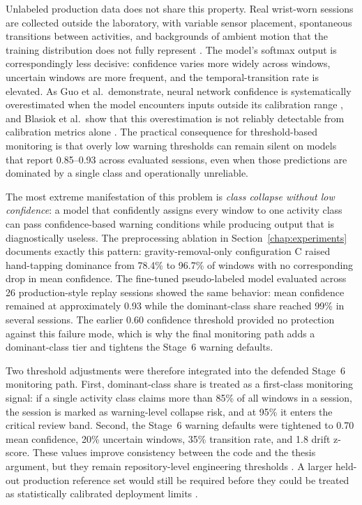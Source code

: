 Unlabeled production data does not share this property. Real wrist-worn sessions are collected outside the laboratory, with variable sensor placement, spontaneous transitions between activities, and backgrounds of ambient motion that the training distribution does not fully represent \cite{dhekane2024transfer,akbari2020personalizing,wang2024enhancing}. The model's softmax output is correspondingly less decisive: confidence varies more widely across windows, uncertain windows are more frequent, and the temporal-transition rate is elevated. As Guo et al.\ demonstrate, neural network confidence is systematically overestimated when the model encounters inputs outside its calibration range \cite{guo2017calibration}, and Blasiok et al.\ show that this overestimation is not reliably detectable from calibration metrics alone \cite{blasiok2024calibration}. The practical consequence for threshold-based monitoring is that overly low warning thresholds can remain silent on models that report 0.85--0.93 across evaluated sessions, even when those predictions are dominated by a single class and operationally unreliable.

The most extreme manifestation of this problem is \emph{class collapse without low confidence}: a model that confidently assigns every window to one activity class can pass confidence-based warning conditions while producing output that is diagnostically useless. The preprocessing ablation in Section~\ref{chap:experiments} documents exactly this pattern: gravity-removal-only configuration C raised hand-tapping dominance from 78.4\% to 96.7\% of windows with no corresponding drop in mean confidence. The fine-tuned pseudo-labeled model evaluated across 26 production-style replay sessions showed the same behavior: mean confidence remained at approximately 0.93 while the dominant-class share reached 99\% in several sessions. The earlier 0.60 confidence threshold provided no protection against this failure mode, which is why the final monitoring path adds a dominant-class tier and tightens the Stage~6 warning defaults.

Two threshold adjustments were therefore integrated into the defended Stage~6 monitoring path. First, dominant-class share is treated as a first-class monitoring signal: if a single activity class claims more than 85\% of all windows in a session, the session is marked as warning-level collapse risk, and at 95\% it enters the critical review band. Second, the Stage~6 warning defaults were tightened to 0.70 mean confidence, 20\% uncertain windows, 35\% transition rate, and 1.8 drift z-score. These values improve consistency between the code and the thesis argument, but they remain repository-level engineering thresholds \cite{shewhart1931economic,montgomery2009sqc}. A larger held-out production reference set would still be required before they could be treated as statistically calibrated deployment limits \cite{hendrycks2017baseline}.

